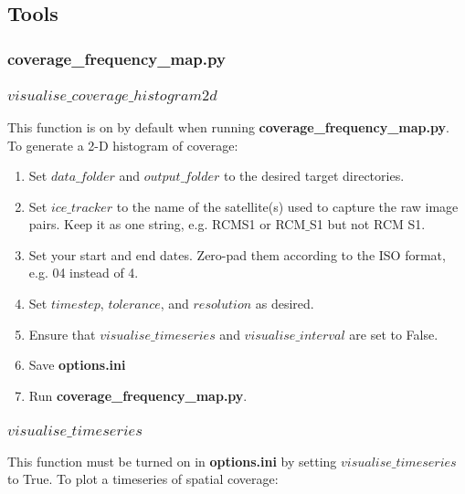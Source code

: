 \documentclass{article}
\begin{document}
    \subsection*{Tools}

        \subsubsection*{\textbf{coverage\_frequency\_map.py}}



        \subsubsection*{$visualise\_coverage\_histogram2d$}

            This function is on by default when running \textbf{coverage\_frequency\_map.py}. To generate a 2-D histogram of coverage:

            \begin{enumerate}
                \item Set $data\_folder$ and $output\_folder$ to the desired target directories.
                \item Set $ice\_tracker$ to the name of the satellite(s) used to capture the raw image pairs. Keep it as one string, e.g. RCMS1 or RCM$\_$S1 but not RCM S1.
                \item Set your start and end dates. Zero-pad them according to the ISO format, e.g. 04 instead of 4.
                \item Set $timestep$, $tolerance$, and $resolution$ as desired.
                \item Ensure that $visualise\_timeseries$ and $visualise\_interval$ are set to False.
                \item Save \textbf{options.ini}
                \item Run \textbf{coverage\_frequency\_map.py}.
            \end{enumerate}

        \subsubsection*{$visualise\_timeseries$}

            This function must be turned on in \textbf{options.ini} by setting $visualise\_timeseries$ to True. To plot a timeseries of spatial coverage:
\end{document}
